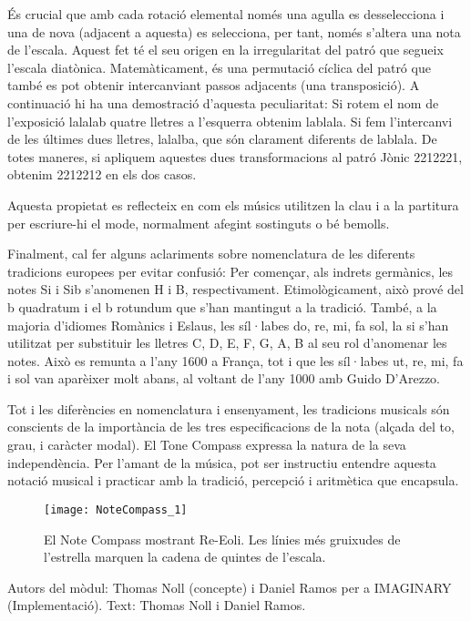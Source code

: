 És crucial que amb cada rotació elemental només una agulla es desselecciona i una de nova (adjacent a aquesta) es selecciona, per tant, només s'altera una nota de l'escala. Aquest fet té el seu origen en la irregularitat del patró que segueix l'escala diatònica. Matemàticament, és una permutació cíclica del patró que també es pot obtenir intercanviant passos adjacents (una transposició). A continuació hi ha una demostració d'aquesta peculiaritat: Si rotem el nom de l'exposició lalalab quatre lletres a l'esquerra obtenim  lablala. Si fem l'intercanvi de les últimes dues lletres, lalalba, que són clarament diferents de lablala. De totes maneres, si apliquem aquestes dues transformacions al patró Jònic 2212221, obtenim 2212212 en els dos casos. 

Aquesta propietat es reflecteix en com els músics utilitzen la clau i a la partitura per escriure-hi el mode, normalment afegint sostinguts o bé bemolls.

Finalment, cal fer alguns aclariments sobre nomenclatura de les diferents tradicions europees per evitar confusió: Per començar, als indrets germànics, les notes Si i Sib s'anomenen H i B, respectivament. Etimològicament, això prové del b quadratum i el b rotundum que s'han mantingut a la tradició. També, a la majoria d'idiomes Romànics i Eslaus, les síl·labes do, re, mi, fa sol, la si s'han utilitzat per substituir les lletres C, D, E, F, G, A, B al seu rol d'anomenar les notes. Això es remunta a l'any 1600 a França, tot i que les síl·labes ut, re, mi, fa i sol van aparèixer molt abans, al voltant de l'any 1000 amb Guido D'Arezzo.


Tot i les diferències en nomenclatura i ensenyament, les tradicions musicals són conscients de la importància de les tres especificacions de la nota (alçada del to, grau, i caràcter modal). El Tone Compass expressa la natura de la seva independència. Per l'amant de la música, pot ser instructiu entendre aquesta notació musical i practicar amb la tradició, percepció i aritmètica que encapsula. 


\begin{figure}[hp]
\centering
\texttt{[image: NoteCompass\_1]}
\caption*{El Note Compass mostrant Re-Eoli. Les línies més gruixudes de l'estrella marquen la cadena de quintes de l'escala.}
\end{figure}


\vfill

Autors del mòdul: Thomas Noll (concepte) i Daniel Ramos per a IMAGINARY (Implementació).
Text: Thomas Noll i Daniel Ramos.
